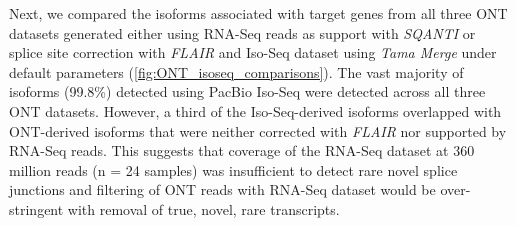 Next, we compared the isoforms associated with target genes from all three ONT datasets generated either using RNA-Seq reads as support with \textit{SQANTI} or splice site correction with \textit{FLAIR} and Iso-Seq dataset using \textit{Tama Merge} under default parameters (\cref{fig:ONT_isoseq_comparisons}). The vast majority of isoforms (99.8\%) detected using PacBio Iso-Seq were detected across all three ONT datasets. However, a third of the Iso-Seq-derived isoforms overlapped with ONT-derived isoforms that were neither corrected with \textit{FLAIR} nor supported by RNA-Seq reads. This suggests that coverage of the RNA-Seq dataset at 360 million reads (n = 24 samples) was insufficient to detect rare novel splice junctions and filtering of ONT reads with RNA-Seq dataset would be over-stringent with removal of true, novel, rare transcripts. %

